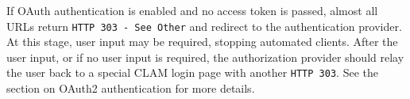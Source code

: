 \documentclass[a4paper,12pt]{report}
\newenvironment{devnotes}
{\newpage
\begin{center}
    \begin{tabular}[h!]{|p{0.8\textwidth}|}
    \hline
    {\bf Development Notes}\\\hline}
{   \\\hline
    \end{tabular}
\end{center}}
\begin{document}
\medskip

If OAuth authentication is enabled and no access token is passed, almost all URLs
return \texttt{HTTP 303 - See Other} and redirect to the authentication
provider. At this stage, user input may be required, stopping automated
clients. After the user input, or if no user input is required, the
authorization provider should relay the user back to a special CLAM login page with another
\texttt{HTTP 303}. See the section on OAuth2 authentication for more details.








\end{document}
